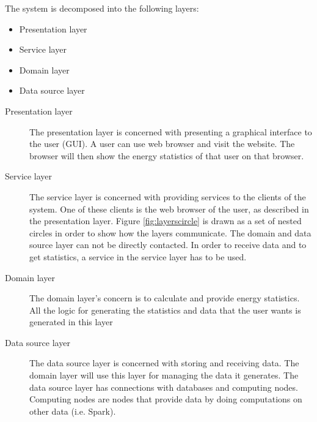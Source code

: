 The system is decomposed into the following layers:
\begin{itemize}
\item Presentation layer
\item Service layer
\item Domain layer
\item Data source layer
\end{itemize}

\begin{description}
\item[Presentation layer] The presentation layer is concerned with presenting a graphical interface to the user (GUI). A user can use web browser and visit the \ShortName website. The browser will then show the energy statistics of that user on that browser.
%
\item[Service layer] The service layer is concerned with providing services to the clients of the system. One of these clients is the web browser of the user, as described in the presentation layer.  Figure \ref{fig:layerscircle} is drawn as a set of nested circles in order to show how the layers communicate. The domain and data source layer can not be directly contacted. In order to receive data and to get statistics, a service in the service layer has to be used.
%
\item[Domain layer] The domain layer's concern is to calculate and provide energy statistics. All the logic for generating the statistics and data that the user wants is generated in this layer
%
\item[Data source layer] The data source layer is concerned with storing and receiving data. The domain layer will use this layer for managing the data it generates. The data source layer has connections with databases and computing nodes. Computing nodes are nodes that provide data by doing computations on other data (i.e. Spark).
\end{description}




